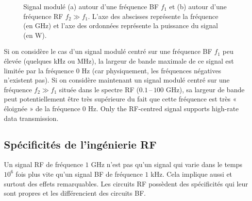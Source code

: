 \begin{figure}[h!]
  \centering
  \caption*{\small Signal modulé (a) autour d'une fréquence BF $f_1$ et (b)
  autour d'une fréquence RF $f_2 \gg f_1$. L'axe des abscisses représente la
  fréquence (en GHz) et l'axe des ordonnées représente la puissance du signal
  (en W).}
\end{figure}

Si on considère le cas d'un signal modulé centré sur une fréquence BF $f_1$ peu
élevée (quelques kHz ou MHz), la largeur de bande maximale de ce signal est
limitée par la fréquence $0$ Hz (car physiquement, les fréquences négatives
n'existent pas). Si on considère maintenant un signal modulé centré sur une
fréquence $f_2 \gg f_1$ située dans le spectre RF ($0.1$\,--\,$100$ GHz), sa
largeur de bande peut potentiellement être très supérieure du fait que cette
fréquence est très « éloignée » de la fréquence $0$ Hz. Only the RF-centred
signal supports high-rate data transmission.

\subsection{Spécificités de l'ingénierie RF}
Un signal RF de fréquence $1$ GHz n'est pas qu'un signal qui varie dans le
temps $10^{6}$ fois plus vite qu'un signal BF de fréquence $1$ kHz. Cela
implique aussi et surtout des effets remarquables. Les circuits RF possèdent des
spécificités qui leur sont propres et les différencient des circuits BF.

